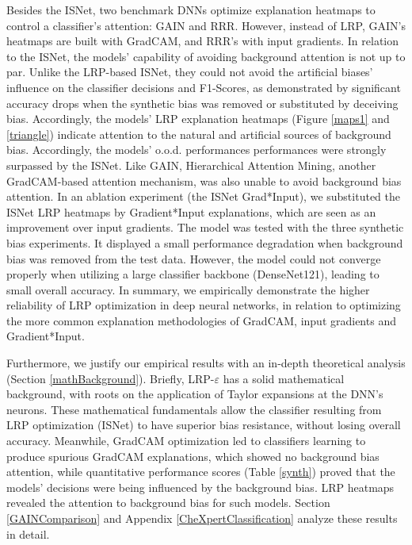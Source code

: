 \documentclass[fleqn,10pt]{wlscirep}
\begin{document}
{Besides the ISNet, two benchmark DNNs optimize explanation heatmaps to control a classifier's attention: GAIN\cite{GAIN} and RRR\cite{RRR}. However, instead of LRP, GAIN's heatmaps are built with GradCAM\cite{GradCAM}, and RRR's with input gradients\cite{saliency}. In relation to the ISNet, the models' capability of avoiding background attention is not up to par. Unlike the LRP-based ISNet, they could not avoid the artificial biases' influence on the classifier decisions and F1-Scores, as demonstrated by significant accuracy drops when the synthetic bias was removed or substituted by deceiving bias. Accordingly, the models' LRP explanation heatmaps (Figure \ref{maps1} and \ref{triangle}) indicate attention to the natural and artificial sources of background bias. Accordingly, the models' o.o.d. performances performances were strongly surpassed by the ISNet. Like GAIN, Hierarchical Attention Mining\cite{HAM}, another GradCAM-based attention mechanism, was also unable to avoid background bias attention. In an ablation experiment (the ISNet Grad*Input), we substituted the ISNet LRP heatmaps by Gradient*Input explanations, which are seen as an improvement over input gradients\cite{GradInput}. The model was tested with the three synthetic bias experiments. It displayed a small performance degradation when background bias was removed from the test data. However, the model could not converge properly when utilizing a large classifier backbone (DenseNet121), leading to small overall accuracy. In summary, we empirically demonstrate the higher reliability of LRP optimization in deep neural networks, in relation to optimizing the more common explanation methodologies of GradCAM, input gradients and Gradient*Input.


Furthermore, we justify our empirical results with an in-depth theoretical analysis (Section \ref{mathBackground}). Briefly, LRP-$\varepsilon$ has a solid mathematical background, with roots on the application of Taylor expansions at the DNN's neurons\cite{LRPBook}. These mathematical fundamentals allow the classifier resulting from LRP optimization (ISNet) to have superior bias resistance, without losing overall accuracy. Meanwhile, GradCAM optimization led to classifiers learning to produce spurious GradCAM explanations, which showed no background bias attention, while quantitative performance scores (Table \ref{synth}) proved that the models' decisions were being influenced by the background bias. LRP heatmaps revealed the attention to background bias for such models. Section \ref{GAINComparison} and Appendix \ref{CheXpertClassification} analyze these results in detail.

}
\end{document}
